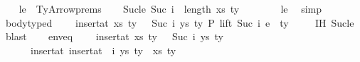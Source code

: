 \begin{isabellebody}
\ \ \isamarkupfalse%
\ le\ {\isacharequal}{\kern0pt}\ TyArrow{\isachardot}{\kern0pt}prems\isanewline
\isanewline
\ \ \isamarkupfalse%
\ Suc{\isacharunderscore}{\kern0pt}le{\isacharcolon}{\kern0pt}\ {\isachardoublequoteopen}Suc\ i\ {\isasymle}\ length\ {\isacharparenleft}{\kern0pt}{\isacharparenleft}{\kern0pt}xs{\isacharcomma}{\kern0pt}\ ty{}{\isacharparenright}{\kern0pt}\ {\isacharhash}{\kern0pt}\ {\isasymGamma}{\isacharparenright}{\kern0pt}{\isachardoublequoteclose}\isanewline
\ \ \ \ \isamarkupfalse%
\ le\ \isamarkupfalse%
\ simp\isanewline
\isanewline
\ \ \isamarkupfalse%
\ body{\isacharunderscore}{\kern0pt}typed{\isacharcolon}{\kern0pt}\isanewline
\ \ \ \ {\isachardoublequoteopen}insert{\isacharunderscore}{\kern0pt}at\ {\isacharparenleft}{\kern0pt}{\isacharparenleft}{\kern0pt}xs{\isacharcomma}{\kern0pt}\ ty{}{\isacharparenright}{\kern0pt}\ {\isacharhash}{\kern0pt}\ {\isasymGamma}{\isacharparenright}{\kern0pt}\ {\isacharparenleft}{\kern0pt}Suc\ i{\isacharparenright}{\kern0pt}\ {\isacharparenleft}{\kern0pt}ys{\isacharcomma}{\kern0pt}\ ty{}{\isacharparenright}{\kern0pt}\ {\isasymturnstile}{\isacharbraceleft}{\kern0pt}P{\isacharbraceright}{\kern0pt}\ lift\ {\isacharparenleft}{\kern0pt}Suc\ i{\isacharparenright}{\kern0pt}\ e\ {\isacharcolon}{\kern0pt}\ ty{}{\isacharprime}{\kern0pt}{\isachardoublequoteclose}\isanewline
\ \ \ \isamarkupfalse%
\ IH\ Suc{\isacharunderscore}{\kern0pt}le\ \isamarkupfalse%
\ blast\isanewline
\isanewline
\ \ \isamarkupfalse%
\ env{\isacharunderscore}{\kern0pt}eq{\isacharcolon}{\kern0pt}\isanewline
\ \ \ \ {\isachardoublequoteopen}insert{\isacharunderscore}{\kern0pt}at\ {\isacharparenleft}{\kern0pt}{\isacharparenleft}{\kern0pt}xs{\isacharcomma}{\kern0pt}\ ty{}{\isacharparenright}{\kern0pt}\ {\isacharhash}{\kern0pt}\ {\isasymGamma}{\isacharparenright}{\kern0pt}\ {\isacharparenleft}{\kern0pt}Suc\ i{\isacharparenright}{\kern0pt}\ {\isacharparenleft}{\kern0pt}ys{\isacharcomma}{\kern0pt}\ ty{}{\isacharparenright}{\kern0pt}\isanewline
\ \ \ \ \ {\isacharequal}{\kern0pt}\ insert{\isacharunderscore}{\kern0pt}at\ {\isacharparenleft}{\kern0pt}insert{\isacharunderscore}{\kern0pt}at\ {\isasymGamma}\ i\ {\isacharparenleft}{\kern0pt}ys{\isacharcomma}{\kern0pt}\ ty{}{\isacharparenright}{\kern0pt}{\isacharparenright}{\kern0pt}\ {}\ {\isacharparenleft}{\kern0pt}xs{\isacharcomma}{\kern0pt}\ ty{}{\isacharparenright}{\kern0pt}{\isachardoublequoteclose}\isanewline

\end{isabellebody}
